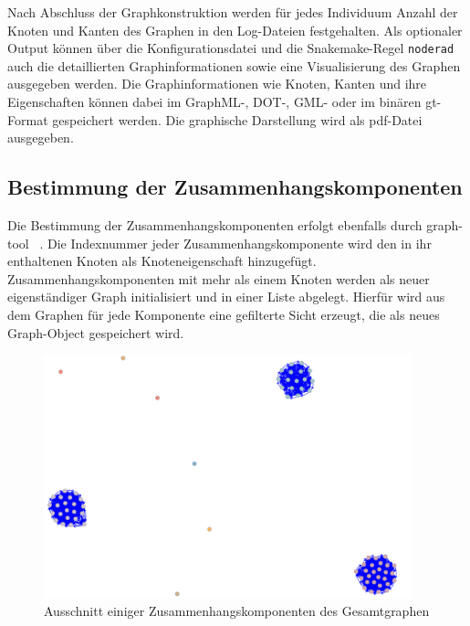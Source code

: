 Nach Abschluss der Graphkonstruktion werden für jedes Individuum Anzahl der Knoten und Kanten des Graphen in den Log-Dateien festgehalten. Als optionaler Output können über die Konfigurationsdatei und die Snakemake-Regel \lstinline|noderad| auch die detaillierten Graphinformationen sowie eine Visualisierung des Graphen ausgegeben werden. Die Graphinformationen wie Knoten, Kanten und ihre Eigenschaften können dabei im GraphML-, DOT-, GML- oder im binären gt-Format gespeichert werden. Die graphische Darstellung wird als pdf-Datei ausgegeben. \\

\subsection{Bestimmung der Zusammenhangskomponenten} \label{subsec:comp}

Die Bestimmung der Zusammenhangskomponenten erfolgt ebenfalls durch graph-tool ~\cite{docs_graph_tool}. Die Indexnummer jeder Zusammenhangskomponente wird den in ihr enthaltenen Knoten als Knoteneigenschaft hinzugefügt. Zusammenhangskomponenten mit mehr als einem Knoten  werden als neuer eigenständiger Graph initialisiert und in einer Liste abgelegt. Hierfür wird aus dem Graphen für jede Komponente eine gefilterte Sicht erzeugt, die als neues Graph-Object gespeichert wird. \\

\begin{figure}[H]
	\begin{center}
		\includegraphics[width=0.95\textwidth]{bilder/all_components_5.png}
		\caption{Ausschnitt einiger Zusammenhangskomponenten des Gesamtgraphen }
		\label{fig:all_comp} 
	\end{center}
\end{figure}

